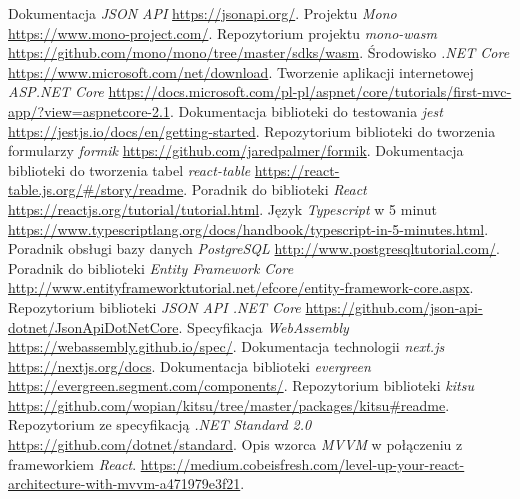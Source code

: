 \documentclass[a4paper,11pt,twoside]{report}
\theoremstyle{definition}
\begin{document}
\begin{thebibliography}{25}%
     Dokumentacja \emph{JSON API} \url{https://jsonapi.org/}.
     Projektu \emph{Mono} \url{https://www.mono-project.com/}.
     Repozytorium projektu \emph{mono-wasm} \url{https://github.com/mono/mono/tree/master/sdks/wasm}.
     Środowisko \emph{.NET Core} \url{https://www.microsoft.com/net/download}.
     Tworzenie aplikacji internetowej \emph{ASP.NET Core} \url{https://docs.microsoft.com/pl-pl/aspnet/core/tutorials/first-mvc-app/?view=aspnetcore-2.1}.
     Dokumentacja biblioteki do testowania \emph{jest} \url{https://jestjs.io/docs/en/getting-started}.
     Repozytorium biblioteki do tworzenia formularzy \emph{formik} \url{https://github.com/jaredpalmer/formik}.
     Dokumentacja biblioteki do tworzenia tabel \emph{react-table} \url{https://react-table.js.org/#/story/readme}.
     Poradnik do biblioteki \emph{React} \url{https://reactjs.org/tutorial/tutorial.html}.
     Język \emph{Typescript} w 5 minut \url{https://www.typescriptlang.org/docs/handbook/typescript-in-5-minutes.html}.
     Poradnik obsługi bazy danych \emph{PostgreSQL} \url{http://www.postgresqltutorial.com/}.
     Poradnik do biblioteki \emph{Entity Framework Core} \url{http://www.entityframeworktutorial.net/efcore/entity-framework-core.aspx}.
     Repozytorium biblioteki \emph{JSON API .NET Core} \url{https://github.com/json-api-dotnet/JsonApiDotNetCore}.
     Specyfikacja \emph{WebAssembly} \url{https://webassembly.github.io/spec/}.
     Dokumentacja technologii \emph{next.js} \url{https://nextjs.org/docs}.
     Dokumentacja biblioteki \emph{evergreen} \url{https://evergreen.segment.com/components/}.
     Repozytorium biblioteki \emph{kitsu} \url{https://github.com/wopian/kitsu/tree/master/packages/kitsu#readme}.
     Repozytorium ze specyfikacją \emph{.NET Standard 2.0} \url{https://github.com/dotnet/standard}.
     Opis wzorca \emph{MVVM} w połączeniu z frameworkiem \emph{React}. \url{https://medium.cobeisfresh.com/level-up-your-react-architecture-with-mvvm-a471979e3f21}.

\end{thebibliography}
\end{document}
